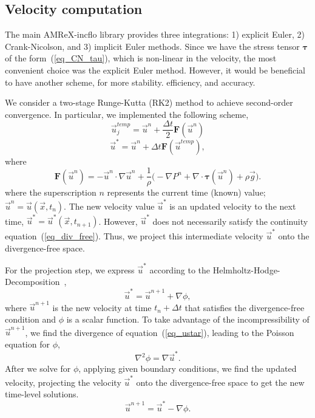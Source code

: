 \subsection{Velocity computation}
The main AMReX-incflo library provides three integrations: 1) explicit Euler, 2) Crank-Nicolson, and 3) implicit Euler methods. 
Since we have the stress tensor ${\bm \tau}$ of the form~(\ref{eq_CN_tau}), which is non-linear in the velocity, the most convenient choice was the explicit Euler method.
 However, it would be beneficial to have another scheme, for more stability. efficiency, and accuracy. 
 \par
 We consider a two-stage Runge-Kutta (RK2) method to achieve second-order convergence. 
In particular, we implemented the following scheme,
\begin{equation}
	\vec{u}_{j}^{temp} = \vec{u}^{n} + \frac{\Delta t}{2} {\bm F} \left( \vec{u}^{n} \right)
	\label{eq_RK2_s1} 
\end{equation}
\begin{equation}
	\vec{u}^{*} = \vec{u}^{n} + \Delta t {\bm F} \left( \vec{u}^{temp} \right),
	\label{eq_RK2_s2}
\end{equation}
where 
\[
  {\bm F} \left( \vec{u}^{n} \right)= 
    -\vec{u}^n \cdot \nabla \vec{u}^n 
    +\frac{1}{\rho}
    \biggl(
    - \nabla P^n 
        + \nabla \cdot   \bm{\tau}(\vec{u}^n)
        +  \rho  \vec{g} 
        \biggr).
\]
where the superscription $n$ represents the current time (known) value; $\vec{u}^n = \vec{u}(\vec{x}, t_n)$. The new velocity value $\vec{u}^*$ is an updated velocity to the next time, $\vec{u}^*  = \vec{u}^* (\vec{x}, t_{n+1})$. However, $\vec{u}^*$ does not necessarily satisfy the continuity equation~(\ref{eq_div_free}). Thus, we project this intermediate velocity $\vec{u}^*$ onto the divergence-free space. 
\par
For the projection step, we express $\vec{u}^{*}$ according to the Helmholtz-Hodge-Decomposition~\cite{chorin_mathematical_1993}, 
\begin{equation}
  \vec{u}^* = \vec{u}^{n+1} + \nabla \phi,
  \label{eq_ustar}
\end{equation}
where $\vec{u}^{n+1}$ is the new velocity at time $t_n + \Delta t$ that satisfies the divergence-free condition and $\phi$ is a scalar function.
To take advantage of the incompressibility of $\vec{u}^{n+1}$, we find the divergence of equation~(\ref{eq_ustar}), leading to the Poisson equation for $\phi$,
\[
  \nabla^2 \phi = \nabla \vec{u}^*.  
\]
After we solve for $\phi$, applying given boundary conditions, we find the updated velocity, projecting the velocity $\vec{u}^*$ onto the divergence-free space to get the new time-level solutions.
\[
  \vec{u}^{n+1} = \vec{u}^* - \nabla \phi.
\]

